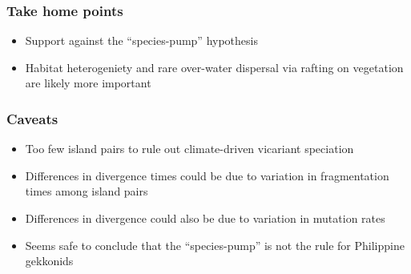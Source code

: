 % 

\begin{frame}
    \frametitle{Take home points}
    \begin{itemize}
        \item<1-> Support against the ``species-pump'' hypothesis
        \item<2-> Habitat heterogeniety and rare over-water dispersal via
            rafting on vegetation are likely more important
    \end{itemize}
\end{frame}

\begin{frame}
    \frametitle{Caveats}
    \begin{itemize}
        \item Too few island pairs to rule out climate-driven vicariant
            speciation
        \item Differences in divergence times could be due to variation in
            fragmentation times among island pairs
        \item Differences in divergence could also be due to variation
            in mutation rates
    \end{itemize}

    \vspace{1cm}
    \begin{itemize}
        \item<2-> Seems safe to conclude that the ``species-pump'' is not the
            rule for Philippine gekkonids
    \end{itemize}
\end{frame}

